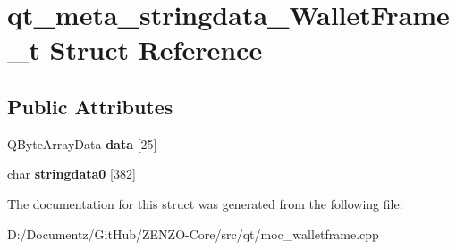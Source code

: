 \hypertarget{structqt__meta__stringdata___wallet_frame__t}{}\section{qt\+\_\+meta\+\_\+stringdata\+\_\+\+Wallet\+Frame\+\_\+t Struct Reference}
\label{structqt__meta__stringdata___wallet_frame__t}
\subsection*{Public Attributes}
\begin{DoxyCompactItemize}
\item 
\mbox{\label{structqt__meta__stringdata___wallet_frame__t_a9865fb64e840f2905035ab599006f024}} 
Q\+Byte\+Array\+Data {\bfseries data} \mbox{[}25\mbox{]}
\item 
\mbox{\label{structqt__meta__stringdata___wallet_frame__t_a9c4b62b29d44be8bdb51f06c06998a56}} 
char {\bfseries stringdata0} \mbox{[}382\mbox{]}
\end{DoxyCompactItemize}


The documentation for this struct was generated from the following file\+:\begin{DoxyCompactItemize}
\item 
D\+:/\+Documentz/\+Git\+Hub/\+Z\+E\+N\+Z\+O-\/\+Core/src/qt/moc\+\_\+walletframe.\+cpp\end{DoxyCompactItemize}
